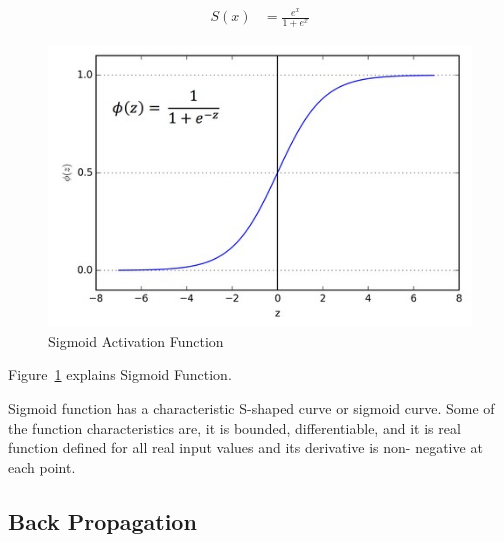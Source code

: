 \begin{align*}
S(x)&=\frac{e^{x}}{1+e^{x}}
\end{align*}

\begin{figure}[!ht]
        \centering\includegraphics[width=\columnwidth]
        {images/sigmoid-activation-function.jpeg}
        \caption{Sigmoid Activation Function~\cite{hid-sp18-401-sigmoid-activation-function}}
        \label{f:Sigmoid-function}
\end{figure}

Figure~\ref{f:Sigmoid-function} explains Sigmoid Function.

Sigmoid function has a characteristic S-shaped curve or sigmoid curve. Some of
the function characteristics are, it is bounded, differentiable, and it is
real function defined for all real input values and its derivative is non-
negative at each point.




\subsection{Back Propagation}


